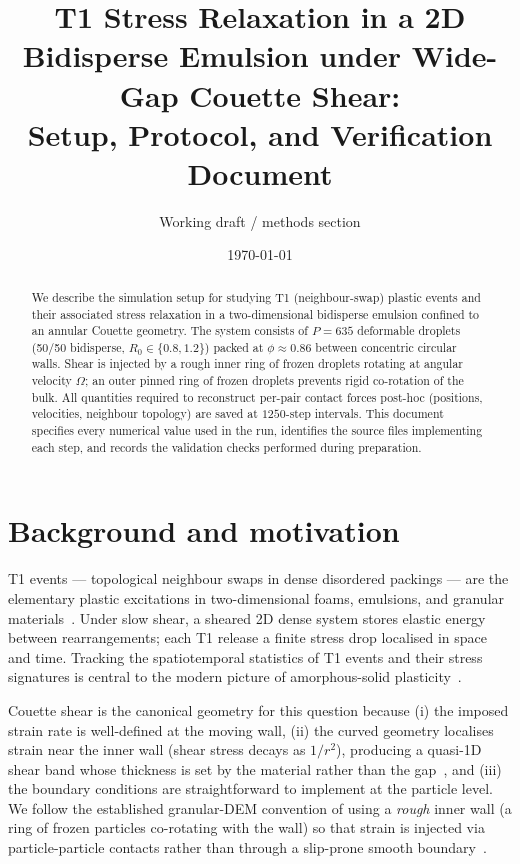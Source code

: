 \documentclass[aps,pre,twocolumn,floatfix,longbibliography]{revtex4-2}
\begin{document}
\title{T1 Stress Relaxation in a 2D Bidisperse Emulsion under Wide-Gap Couette Shear:\\
       Setup, Protocol, and Verification Document}

\author{Working draft / methods section}
\date{\today}

\begin{abstract}
We describe the simulation setup for studying T1 (neighbour-swap) plastic
events and their associated stress relaxation in a two-dimensional
bidisperse emulsion confined to an annular Couette geometry.  The system
consists of $P = 635$ deformable droplets (50/50 bidisperse, $R_0 \in
\{0.8, 1.2\}$) packed at $\phi \approx 0.86$ between concentric circular
walls.  Shear is injected by a rough inner ring of frozen droplets
rotating at angular velocity $\Omega$; an outer pinned ring of frozen
droplets prevents rigid co-rotation of the bulk.  All quantities required
to reconstruct per-pair contact forces post-hoc (positions, velocities,
neighbour topology) are saved at $1250$-step intervals.  This document
specifies every numerical value used in the run, identifies the source
files implementing each step, and records the validation checks performed
during preparation.
\end{abstract}

\maketitle

\section{Background and motivation}
\label{sec:background}

T1 events --- topological neighbour swaps in dense disordered packings ---
are the elementary plastic excitations in two-dimensional foams,
emulsions, and granular materials~\cite{durian1995foam,kabla2003t1}.
Under slow shear, a sheared 2D dense system stores elastic energy
between rearrangements; each T1 release a finite stress drop
localised in space and time.  Tracking the spatiotemporal statistics of
T1 events and their stress signatures is central to the modern picture
of amorphous-solid plasticity~\cite{falk1998dynamics,lemaitre2009sum}.

Couette shear is the canonical geometry for this question because
(i) the imposed strain rate is well-defined at the moving wall,
(ii) the curved geometry localises strain near the inner wall (shear
stress decays as $1/r^2$), producing a quasi-1D shear band whose
thickness is set by the material rather than the
gap~\cite{mueth2000signatures,coussot2002viscosity}, and
(iii) the boundary conditions are
straightforward to implement at the particle level.  We follow the
established granular-DEM convention of using a \emph{rough} inner wall
(a ring of frozen particles co-rotating with the wall) so that strain
is injected via particle-particle contacts rather than through a
slip-prone smooth boundary~\cite{pouliquen2002granular}.
\end{document}
